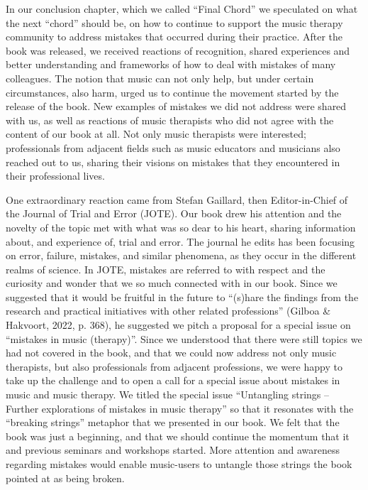 \documentclass[authordate, empirical, issue]{jote-new-article}
\begin{document}
In our conclusion chapter, which we called “Final Chord” we speculated on what the next “chord” should be, on how to continue to support the music therapy community to address mistakes that occurred during their practice. After the book was released, we received reactions of recognition, shared experiences and better understanding and frameworks of how to deal with mistakes of many colleagues. The notion that music can not only help, but under certain circumstances, also harm, urged us to continue the movement started by the release of the book. New examples of mistakes we did not address were shared with us, as well as reactions of music therapists who did not agree with the content of our book at all. Not only music therapists were interested; professionals from adjacent fields such as music educators and musicians also reached out to us, sharing their visions on mistakes that they encountered in their professional lives.



One extraordinary reaction came from Stefan Gaillard, then Editor-in-Chief of the Journal of Trial and Error (JOTE). Our book drew his attention and the novelty of the topic met with what was so dear to his heart, sharing information about, and experience of, trial and error. The journal he edits has been focusing on error, failure, mistakes, and similar phenomena, as they occur in the different realms of science. In JOTE, mistakes are referred to with respect and the curiosity and wonder that we so much connected with in our book. Since we suggested that it would be fruitful in the future to “(s)hare the findings from the research and practical initiatives with other related professions” (Gilboa \& Hakvoort, 2022, p. 368), he suggested we pitch a proposal for a special issue on “mistakes in music (therapy)”. Since we understood that there were still topics we had not covered in the book, and that we could now address not only music therapists, but also professionals from adjacent professions, we were happy to take up the challenge and to open a call for a special issue about mistakes in music and music therapy. We titled the special issue “Untangling strings -- Further explorations of mistakes in music therapy” so that it resonates with the “breaking strings” metaphor that we presented in our book. We felt that the book was just a beginning, and that we should continue the momentum that it and previous seminars and workshops started. More attention and awareness regarding mistakes would enable music-users to untangle those strings the book pointed at as being broken.
\end{document}
